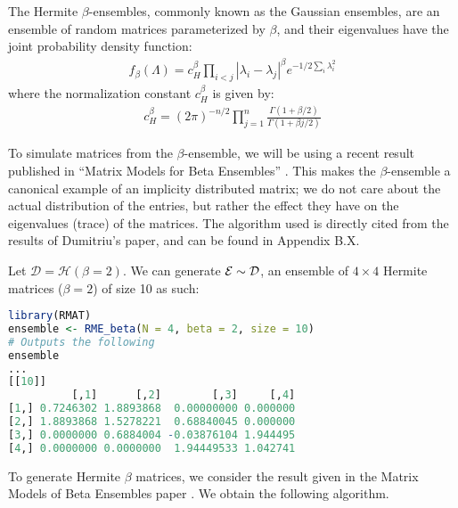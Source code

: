 \begin{definition}
The Hermite $\beta$-ensembles, commonly known as the Gaussian ensembles, are an ensemble of random matrices parameterized by $\beta$, and their eigenvalues have the joint probability density function:
\begin{align*}
f_\beta(\Lambda) = c_H^\beta \prod_{i < j} |\lambda_i - \lambda_j|^\beta e^{-1/2\sum_i \lambda_i^2}
\end{align*}
where the normalization constant $c_H^\beta$ is given by:
\begin{align*}
c_H^\beta = (2\pi)^{-n/2} \prod_{j = 1}^n \frac{\Gamma(1 + \beta/2)}{\Gamma(1 + \beta j/2)}
\end{align*}
\end{definition}

To simulate matrices from the $\beta$-ensemble, we will be using a recent result published in ``Matrix Models for Beta Ensembles'' \cite{dumitriu}.
This makes the $\beta$-ensemble a canonical example of an implicity distributed matrix; we do not care about the actual distribution of the entries,
but rather the effect they have on the eigenvalues (trace) of the matrices.
The algorithm used is directly cited from the results of Dumitriu's paper, and can be found in Appendix B.X.

\begin{code}[Hermite Beta = 2 Ensemble]
Let $\mathcal{D} = \mathcal{H}(\beta = 2)$. We can generate $\mathcal{E} \sim \mathcal{D}$, an ensemble of $4 \times 4$ Hermite matrices ($\beta = 2$) of size 10 as such:
\end{code}

\begin{lstlisting}[language=R]
library(RMAT)
ensemble <- RME_beta(N = 4, beta = 2, size = 10)
# Outputs the following
ensemble
...
[[10]]
          [,1]      [,2]        [,3]     [,4]
[1,] 0.7246302 1.8893868  0.00000000 0.000000
[2,] 1.8893868 1.5278221  0.68840045 0.000000
[3,] 0.0000000 0.6884004 -0.03876104 1.944495
[4,] 0.0000000 0.0000000  1.94449533 1.042741
\end{lstlisting}



To generate Hermite $\beta$ matrices, we consider the result given in the Matrix Models of Beta Ensembles paper \cite{dumitriu}. We obtain the following algorithm.

